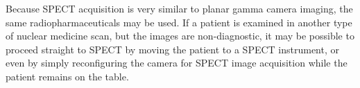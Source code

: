 \documentclass{article}
\begin{document}
Because SPECT acquisition is very similar to planar gamma camera imaging, the same radiopharmaceuticals may be used. If a patient is examined in another type of nuclear medicine scan, but the images are non-diagnostic, it may be possible to proceed straight to SPECT by moving the patient to a SPECT instrument, or even by simply reconfiguring the camera for SPECT image acquisition while the patient remains on the table.
\end{document}
